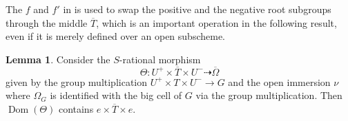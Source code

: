 \documentclass[11pt, reqno]{amsart}
\theoremstyle{plain}
\theoremstyle{definition}
\newtheorem{lemma}[theorem]{Lemma}
\DeclareMathOperator{\Dom}{Dom} %
\begin{document}
The $f$ and $f'$ in  is used to swap the positive and the negative root subgroups through the middle $\overline{T}$, which is an important operation in the following result, even if it is merely defined over an open subscheme.

\begin{lemma}\label{extensionofmultiplication}
    Consider the $S$-rational morphism 
    $$\Theta: U^+\times \overline{T}\times U^-\dashrightarrow \overline{\Omega}$$
    given by the group multiplication $U^+\times T\times U^-\longrightarrow G$ and the open immersion $\nu$  where $\Omega_G$ is identified with the big cell of $G$ via the group multiplication. Then $\Dom(\Theta)$ contains $e\times \overline{T}\times e$.
\end{lemma}
\end{document}
